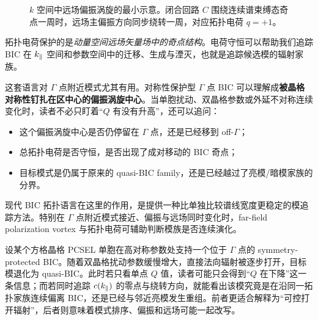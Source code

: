 \begin{figure}[htbp]
  \centering
  \caption{$k$ 空间中远场偏振涡旋的最小示意。闭合回路 $C$ 围绕连续谱束缚态奇点一周时，远场主偏振方向同步绕转一周，对应拓扑电荷 $q=+1$。}
  \label{fig:bic_polarization_vortex}
\end{figure}

拓扑电荷保护的是\emph{动量空间远场矢量场中的奇点结构}。电荷守恒可以帮助我们追踪 BIC 在 $k_\parallel$ 空间和参数空间中的迁移、生成与湮灭，也就是追踪候选模的辐射家族。

这套语言对 $\Gamma$ 点附近模式尤其有用。对称性保护型 $\Gamma$ 点 BIC 可以理解成\textbf{被晶格对称性钉扎在区中心的偏振涡旋中心}。当单胞扰动、双晶格参数或外延不对称连续变化时，读者不必只盯着“$Q$ 有没有升高”，还可以追问：
\begin{itemize}
  \item 这个偏振涡旋中心是否仍停留在 $\Gamma$ 点，还是已经移到 off-$\Gamma$；
  \item 总拓扑电荷是否守恒，是否出现了成对移动的 BIC 奇点；
  \item 目标模式是仍属于原来的 quasi-BIC family，还是已经越过了亮模/暗模家族的分界。
\end{itemize}

现代 BIC 拓扑语言在这里的作用，是提供一种比单独比较谱线宽度更稳定的模追踪方法。特别在 $\Gamma$ 点附近模式接近、偏振与远场同时变化时，far-field polarization vortex 与拓扑电荷可辅助判断模族是否连续演化。

设某个方格晶格 PCSEL 单胞在高对称参数处支持一个位于 $\Gamma$ 点的 symmetry-protected BIC。随着双晶格扰动参数缓慢增大，直接法向辐射被逐步打开，目标模退化为 quasi-BIC。此时若只看单点 $Q$ 值，读者可能只会得到“$Q$ 在下降”这一条信息；而若同时追踪 $c(k_\parallel)$ 的零点与绕转方向，就能看出该模究竟是在沿同一拓扑家族连续偏离 BIC，还是已经与邻近亮模发生重组。前者更适合解释为“可控打开辐射”，后者则意味着模式排序、偏振和远场可能一起改写。

